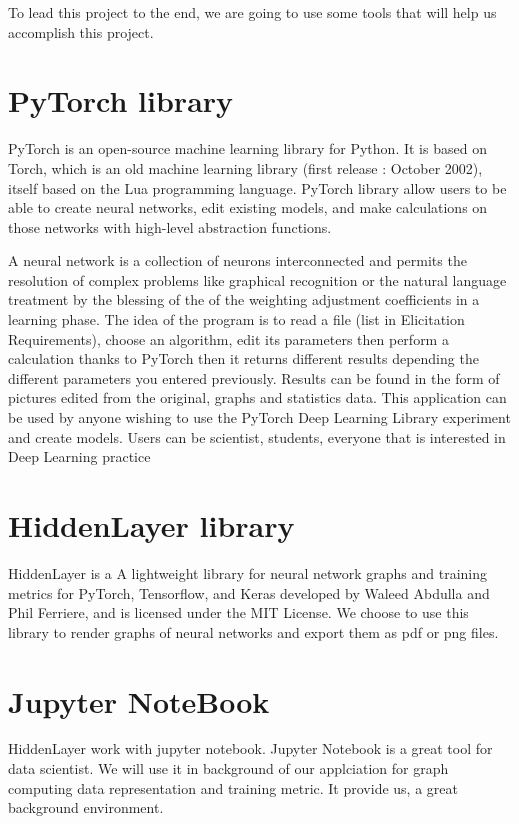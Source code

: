 To lead this project to the end, we are going to use some tools that will help us accomplish this project.

\section{PyTorch library}

PyTorch is an open-source machine learning library for Python. It is based on Torch, which is an old machine learning library (first release : October 2002), itself based on the Lua programming language. PyTorch library allow users to be able to create neural networks, edit existing models, and make calculations on those networks with high-level abstraction functions.

A neural network is a collection of neurons interconnected and permits the resolution of complex problems like graphical recognition or the natural language treatment by the blessing of the  of the weighting adjustment coefficients in a learning phase.
The idea of the program is to read a file (list in Elicitation Requirements), choose an algorithm, edit its parameters then perform a calculation thanks to PyTorch then it returns different results depending the different parameters you entered previously. Results can be found in the form of pictures edited from the original, graphs and statistics data.
\newline This application can be used by anyone wishing to use the PyTorch Deep Learning Library experiment and create models. Users can be scientist, students, everyone that is interested in Deep Learning practice

\section{HiddenLayer library}
HiddenLayer is a A lightweight library for neural network graphs and training metrics for PyTorch, Tensorflow, and Keras developed by Waleed Abdulla  and Phil Ferriere, and is licensed under the MIT License.
\newline We choose to use this library to render graphs of neural networks and export them as pdf or png files.

\section{Jupyter NoteBook}
HiddenLayer work with jupyter notebook. Jupyter Notebook is a great tool for data scientist. We will use it in background of our applciation for graph computing data representation and training metric. It provide us, a great background environment. 
